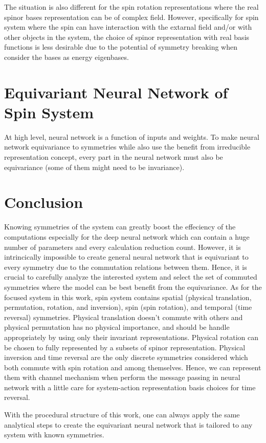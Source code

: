 \documentclass[reprint, 10pt]{revtex4-2}
\begin{document}
The situation is also different for the spin rotation representations where the real spinor bases representation can 
be of complex field. However, specifically for spin system where the spin can have interaction with the extarnal field 
and/or with other objects in the system, the choice of spinor representation with real basis functions is less desirable 
due to the potential of symmetry breaking when consider the bases as energy eigenbases.

\section{Equivariant Neural Network of Spin System}
At high level, neural network is a function of inputs and weights. To make neural network equivariance to symmetries
while also use the benefit from irreducible representation concept, every part in the neural network must also be
equivariance (some of them might need to be invariance). 

\section{Conclusion}
Knowing symmetries of the system can greatly boost the effeciency of the computations especially for the deep neural network
which can contain a huge number of parameters and every calculation reduction count. However, it is intrincically impossible 
to create general neural network that is equivariant to every symmetry due to the commutation relations between them. 
Hence, it is crucial to carefully analyze the interested system and select the set of commuted symmetries where the 
model can be best benefit from the equivariance. As for the focused system in this work, spin system contains spatial 
(physical translation, permutation, rotation, and inversion), spin (spin rotation), and temporal (time reversal) symmetries.
Physical translation doesn't commute with others and physical permutation has no physical importance, and should
be handle appropriately by using only their invariant representations. Physical rotation can be chosen to fully represented by 
a subsets of spinor representation. Physical inversion and time reversal are the only discrete symmetries considered 
which both commute with spin rotation and among themselves. Hence, we can represent them with channel mechanism when perform
the message passing in neural network with a little care for system-action representation basis choices for time reversal. 

With the procedural structure of this work, one can always apply the same analytical steps to create the equivariant 
neural network that is tailored to any system with known symmetries.
\end{document}

